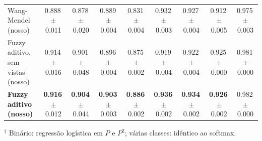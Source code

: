 \begin{table}[t]
{\begin{tabular}{lcccccccc}
  \midrule
  Wang-Mendel (nosso) & 0.888\,{\scriptsize$\pm$0.011} & 0.878\,{\scriptsize$\pm$0.020} & 0.889\,{\scriptsize$\pm$0.004} & 0.831\,{\scriptsize$\pm$0.004} & 0.932\,{\scriptsize$\pm$0.003} & 0.927\,{\scriptsize$\pm$0.004} & 0.912\,{\scriptsize$\pm$0.005} & 0.975\,{\scriptsize$\pm$0.003} \\
  Fuzzy aditivo, sem vistas (nosso) & 0.914\,{\scriptsize$\pm$0.016} & 0.901\,{\scriptsize$\pm$0.048} & 0.896\,{\scriptsize$\pm$0.004} & 0.875\,{\scriptsize$\pm$0.002} & 0.919\,{\scriptsize$\pm$0.004} & 0.922\,{\scriptsize$\pm$0.004} & 0.925\,{\scriptsize$\pm$0.000} & 0.981\,{\scriptsize$\pm$0.000} \\
  \textbf{Fuzzy aditivo (nosso)} & \textbf{0.916}\,{\scriptsize$\pm$0.012} & \textbf{0.904}\,{\scriptsize$\pm$0.044} & \textbf{0.903}\,{\scriptsize$\pm$0.003} & \textbf{0.886}\,{\scriptsize$\pm$0.002} & \textbf{0.936}\,{\scriptsize$\pm$0.002} & \textbf{0.934}\,{\scriptsize$\pm$0.002} & \textbf{0.926}\,{\scriptsize$\pm$0.002} & 0.982\,{\scriptsize$\pm$0.000} \\
  \bottomrule
\end{tabular}}

\vspace{2pt}
{\footnotesize $^\dagger$ Binário: regressão logística em $P$ e $P^2$; várias classes: idêntico ao softmax.}
\end{table}

